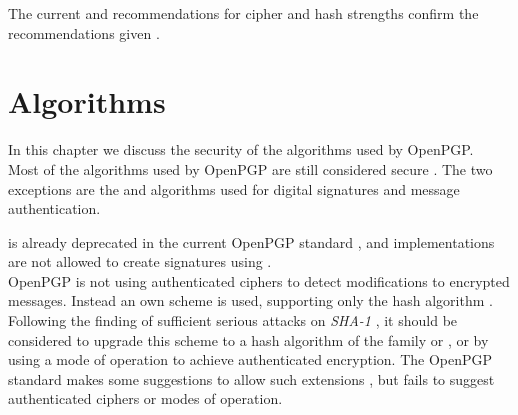 The current  and  recommendations for cipher and hash strengths confirm the recommendations given \cite{keylenNIST} \cite{KeylenBSI}. 

\section{Algorithms}

In this chapter we discuss the security of the algorithms used by OpenPGP.  \\




Most of the algorithms used by OpenPGP are still considered secure \citep{TUB2015}. 
The two exceptions are the  \citep{XieLF13} and  \citep{stevens2012attacks} algorithms used for digital signatures and message authentication. 

 is already deprecated in the current OpenPGP standard \citep[section 14]{RFC4880}, and implementations are not allowed to create signatures using .   \\

OpenPGP is not using authenticated ciphers to detect modifications to encrypted messages.
Instead an own scheme is used, supporting only the  hash algorithm \citep[section 5.13]{RFC4880}. 
Following the finding of sufficient serious attacks on \textit{SHA-1} \cite{stevens2012attacks}, it should be considered to upgrade this scheme to a hash algorithm of the  family or , or by using a mode of operation to achieve authenticated encryption. The OpenPGP standard makes some suggestions to allow such extensions \citep[section 13.11]{RFC4880}, but fails to suggest authenticated ciphers or modes of operation.




